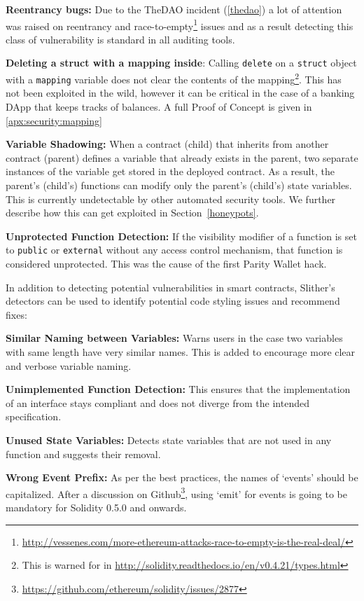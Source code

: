 \textbf{Reentrancy bugs:} Due to the TheDAO incident (\ref{thedao}) a lot of attention was raised on reentrancy and race-to-empty\footnote{\url{http://vessenes.com/more-ethereum-attacks-race-to-empty-is-the-real-deal/}} issues and as a result detecting this class of vulnerability is standard in all auditing tools.

\textbf{Deleting a struct with a mapping inside}: Calling \texttt{delete} on a \texttt{struct} object with a \texttt{mapping} variable does not clear the contents of the mapping\footnote{This is warned for in \url{http://solidity.readthedocs.io/en/v0.4.21/types.html}}. This has not been exploited in the wild, however it can be critical in the case of a banking DApp that keeps tracks of balances. A full Proof of Concept is given in \ref{apx:security:mapping}

\textbf{Variable Shadowing:} When a contract (child) that inherits from another contract (parent) defines a variable that already exists in the parent, two separate instances of the variable get stored in the deployed contract. As a result, the parent's (child's) functions can modify only the parent's (child's) state variables. This is currently undetectable by other automated security tools. We further describe how this can get exploited in Section~\ref{honeypots}.

\textbf{Unprotected Function Detection:} If the visibility modifier of a function is set to \texttt{public} or \texttt{external} without any access control mechanism, that function is considered unprotected. This was the cause of the first Parity Wallet hack.

In addition to detecting potential vulnerabilities in smart contracts, Slither's detectors can be used to identify potential code styling issues and recommend fixes:

\textbf{Similar Naming between Variables:} Warns users in the case two variables with same length have very similar names. This is added to encourage more clear and verbose variable naming.

\textbf{Unimplemented Function Detection:} This ensures that the implementation of an interface stays compliant and does not diverge from the intended specification.

\textbf{Unused State Variables:} Detects state variables that are not used in any function and suggests their removal.

\textbf{Wrong Event Prefix:} As per the best practices, the names of `events' should be capitalized. After a discussion on Github\footnote{\url{https://github.com/ethereum/solidity/issues/2877}}, using `emit' for events is going to be mandatory for Solidity 0.5.0 and onwards.

